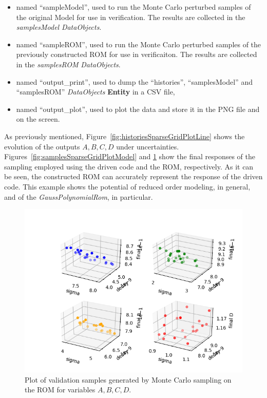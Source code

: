 \begin{enumerate}
\begin{itemize}
     \item {} named ``sampleModel'', used to run the
     Monte Carlo perturbed samples of the original Model for use in verification.  The results are
     collected in the \textit{samplesModel} \textit{DataObjects}.
     \item {} named ``sampleROM'', used to run the
     Monte Carlo perturbed samples of the previously constructed ROM for use in verificaiton.  The results are
     collected in the \textit{samplesROM} \textit{DataObjects}.
     \item  {} named ``output\_print'', used to dump
     the ``histories'', ``samplesModel'' and ``samplesROM'' \textit{DataObjects}
     \textbf{Entity} in a CSV file,
     \item  {} named ``output\_plot'', used to
     plot the data and store it in the PNG file and
     on the screen.
   \end{itemize}
\end{enumerate}
 As previously mentioned, Figure~\ref{fig:historiesSparseGridPlotLine}
 shows the evolution of the outputs $A,B,C,D$ under uncertainties.
 Figures~\ref{fig:samplesSparseGridPlotModel} and
 \ref{fig:samplesROMSparseGridPlot} show the final responses
 of the sampling employed using the driven code and the ROM,
 respectively. As it can be seen, the constructed ROM can accurately
 represent the response of the driven code. This example shows the
 potential of reduced order modeling, in general, and of the
 \textit{GaussPolynomialRom}, in particular.

 \begin{figure}[h!]
  \centering
  \includegraphics[scale=0.7]{../../tests/framework/user_guide/ForwardSamplingStrategies/gold/RunDir/SparseGrid/1-samplesROMPlot3D_scatter-scatter-scatter-scatter.png}
  \caption{Plot of validation samples generated by Monte Carlo sampling on the ROM for variables $A,B,C,D$.}
  \label{fig:samplesROMSparseGridPlot}
 \end{figure}








